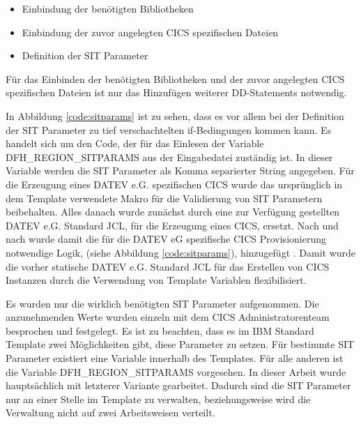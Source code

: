 \begin{itemize}
\item Einbindung der benötigten Bibliotheken
\item Einbindung der zuvor angelegten CICS spezifischen Dateien
\item Definition der SIT Parameter
\end{itemize}

Für das Einbinden der benötigten Bibliotheken und der zuvor angelegten CICS spezifischen Dateien ist nur das Hinzufügen weiterer DD-Statements notwendig.

In Abbildung \ref{code:sitparams} ist zu sehen, dass es vor allem bei der Definition der SIT Parameter zu tief verschachtelten if-Bedingungen kommen kann.
Es handelt sich um den Code, der für das Einlesen der Variable  \glqq DFH\_REGION\_SITPARAMS\grqq{} aus der Eingabedatei zuständig ist.
In dieser Variable werden die SIT Parameter als Komma separierter String angegeben.
Für die Erzeugung eines DATEV e.G. spezifischen CICS wurde das ursprünglich in dem Template verwendete Makro für die Validierung von SIT Parametern beibehalten.
Alles danach wurde zunächst durch eine zur Verfügung gestellten DATEV e.G. Standard JCL, für die Erzeugung eines CICS, ersetzt.
Nach und nach wurde damit die für die DATEV eG spezifische CICS Provisionierung notwendige Logik, (siehe Abbildung \ref{code:sitparams}),  hinzugefügt .
Damit wurde die vorher statische DATEV e.G. Standard JCL für das Erstellen von CICS Instanzen durch die Verwendung von Template  Variablen flexibilisiert.

\begin{minipage}{\linewidth}

\end{minipage}

Es wurden nur die wirklich benötigten SIT Parameter aufgenommen.
Die anzunehmenden Werte wurden einzeln mit dem CICS Administratorenteam besprochen und festgelegt.
Es ist zu beachten, dass es im IBM Standard Template zwei Möglichkeiten gibt, diese Parameter zu setzen.
Für bestimmte SIT Parameter existiert eine Variable innerhalb des Templates.
Für alle anderen ist die Variable \glqq DFH\_REGION\_SITPARAMS\grqq{} vorgesehen.
In dieser Arbeit wurde hauptsächlich mit letzterer Variante gearbeitet.
Dadurch sind die SIT Parameter nur an einer Stelle im Template zu verwalten, beziehungsweise wird die Verwaltung  nicht auf zwei Arbeitsweisen verteilt.

